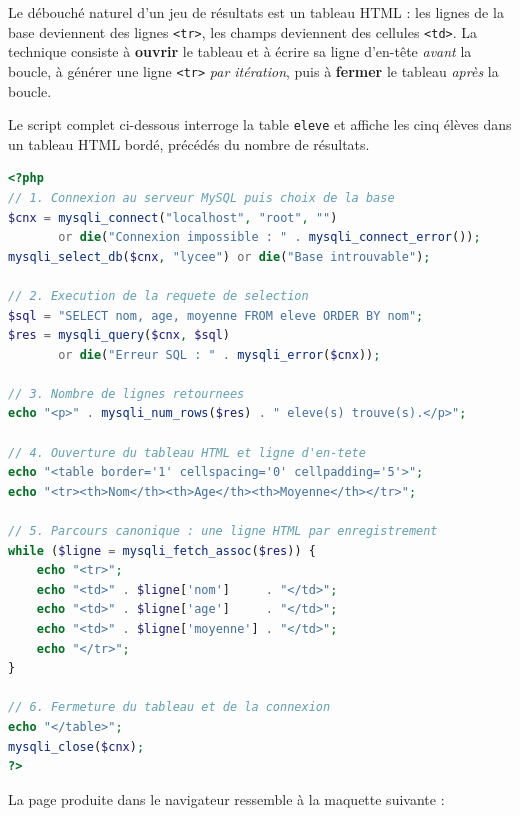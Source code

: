 \documentclass[11pt]{article}
\begin{document}
Le débouché naturel d'un jeu de résultats est un tableau HTML : les lignes de la base deviennent des lignes \texttt{<tr>}, les champs deviennent des cellules \texttt{<td>}. La technique consiste à \textbf{ouvrir} le tableau et à écrire sa ligne d'en-tête \emph{avant} la boucle, à générer une ligne \texttt{<tr>} \emph{par itération}, puis à \textbf{fermer} le tableau \emph{après} la boucle.

\begin{exemplebox}
Le script complet ci-dessous interroge la table \texttt{eleve} et affiche les cinq élèves dans un tableau HTML bordé, précédés du nombre de résultats.
\begin{lstlisting}[language=Php]
<?php
// 1. Connexion au serveur MySQL puis choix de la base
$cnx = mysqli_connect("localhost", "root", "")
       or die("Connexion impossible : " . mysqli_connect_error());
mysqli_select_db($cnx, "lycee") or die("Base introuvable");

// 2. Execution de la requete de selection
$sql = "SELECT nom, age, moyenne FROM eleve ORDER BY nom";
$res = mysqli_query($cnx, $sql)
       or die("Erreur SQL : " . mysqli_error($cnx));

// 3. Nombre de lignes retournees
echo "<p>" . mysqli_num_rows($res) . " eleve(s) trouve(s).</p>";

// 4. Ouverture du tableau HTML et ligne d'en-tete
echo "<table border='1' cellspacing='0' cellpadding='5'>";
echo "<tr><th>Nom</th><th>Age</th><th>Moyenne</th></tr>";

// 5. Parcours canonique : une ligne HTML par enregistrement
while ($ligne = mysqli_fetch_assoc($res)) {
    echo "<tr>";
    echo "<td>" . $ligne['nom']     . "</td>";
    echo "<td>" . $ligne['age']     . "</td>";
    echo "<td>" . $ligne['moyenne'] . "</td>";
    echo "</tr>";
}

// 6. Fermeture du tableau et de la connexion
echo "</table>";
mysqli_close($cnx);
?>
\end{lstlisting}
\end{exemplebox}

La page produite dans le navigateur ressemble à la maquette suivante :
\end{document}
